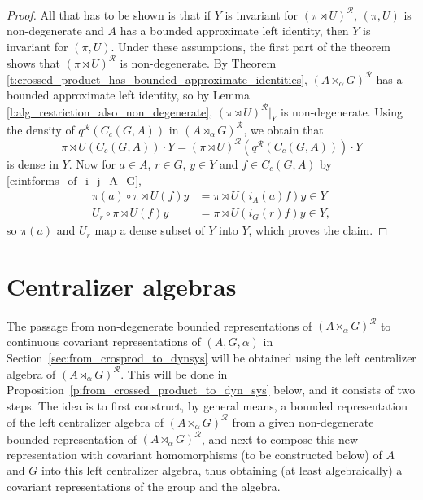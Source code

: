 \documentclass{amsart}
\theoremstyle{plain}
\theoremstyle{definition}
\numberwithin{equation}{section}
\begin{document}
\begin{proof}
 All that has to be shown is that if $Y$ is invariant for ${(\pi \rtimes U)^\mathcal R}$, ${(\pi,U)}$ is non-degenerate and $A$ has a bounded approximate left identity, then $Y$ is invariant for ${(\pi,U)}$. Under these assumptions, the first part of the theorem shows that ${(\pi \rtimes U)^\mathcal R}$ is non-degenerate. By Theorem \ref{t:crossed_product_has_bounded_approximate_identities}, ${(A {\rtimes}_\alpha G)^\mathcal{R}}$ has a bounded approximate left identity, so by Lemma \ref{l:alg_restriction_also_non_degenerate}, ${(\pi \rtimes U)^\mathcal R}|_Y$ is non-degenerate. Using the density of ${q^{\mathcal R}}(C_c(G,A))$ in ${(A {\rtimes}_\alpha G)^\mathcal{R}}$, we obtain that
\[ {\pi \rtimes U}(C_c(G,A)) \cdot Y = {(\pi \rtimes U)^\mathcal R} \left( {q^{\mathcal R}}(C_c(G,A)) \right) \cdot Y \]
is dense in $Y$. Now for $a \in A$, $r \in G$, $y \in Y$ and $f \in C_c(G,A)$ by \eqref{e:intforms_of_i_j_A_G},
\begin{align*}
 \pi(a) \circ {\pi \rtimes U}(f)y &= {\pi \rtimes U}(i_A(a)f)y \in Y \\
 U_r \circ {\pi \rtimes U}(f)y &= {\pi \rtimes U}(i_G(r)f)y \in Y,
\end{align*}
 so $\pi(a)$ and $U_r$ map a dense subset of $Y$ into $Y$, which proves the claim.
\end{proof}

\section{Centralizer algebras}\label{sec:centralizer_algebras}

The passage from non-degenerate bounded representations of ${(A {\rtimes}_\alpha G)^\mathcal{R}}$ to continuous covariant representations of ${(A,G,\alpha)}$ in Section~\ref{sec:from_crosprod_to_dynsys} will be obtained using the left centralizer algebra of ${(A {\rtimes}_\alpha G)^\mathcal{R}}$. This will be done in Proposition~\ref{p:from_crossed_product_to_dyn_sys} below, and it consists of two steps. The idea is to first construct, by general means, a bounded representation of the left centralizer algebra of ${(A {\rtimes}_\alpha G)^\mathcal{R}}$ from a given non-degenerate bounded representation of ${(A {\rtimes}_\alpha G)^\mathcal{R}}$, and next to compose this new representation with covariant homomorphisms (to be constructed below) of $A$ and $G$ into this left centralizer algebra, thus obtaining (at least algebraically) a covariant representations of the group and the algebra.
\end{document}
